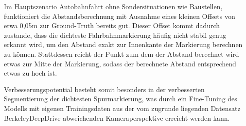 Im Hauptszenario Autobahnfahrt ohne Sondersituationen wie Baustellen, funktioniert die Abstandsberechnung mit Ausnahme eines kleinen Offsets von etwa 0,05m zur Ground-Truth bereits gut. Dieser Offset kommt dadurch zustande, dass die dichteste Fahrbahnmarkierung häufig nicht stabil genug erkannt wird, um den Abstand exakt zur Innenkante der Markierung berechnen zu können. Stattdessen reicht der Punkt zum dem der Abstand berechnet wird etwas zur Mitte der Markierung, sodass der berechnete Abstand entsprechend etwas zu hoch ist.

Verbesserungspotential besteht somit besonders in der verbesserten Segmentierung der dichtesten Spurmarkierung, was durch ein Fine-Tuning des Modells mit eigenen Trainingsdaten aus der vom zugrunde liegenden Datensatz BerkeleyDeepDrive abweichenden Kameraperspektive erreicht werden kann.

